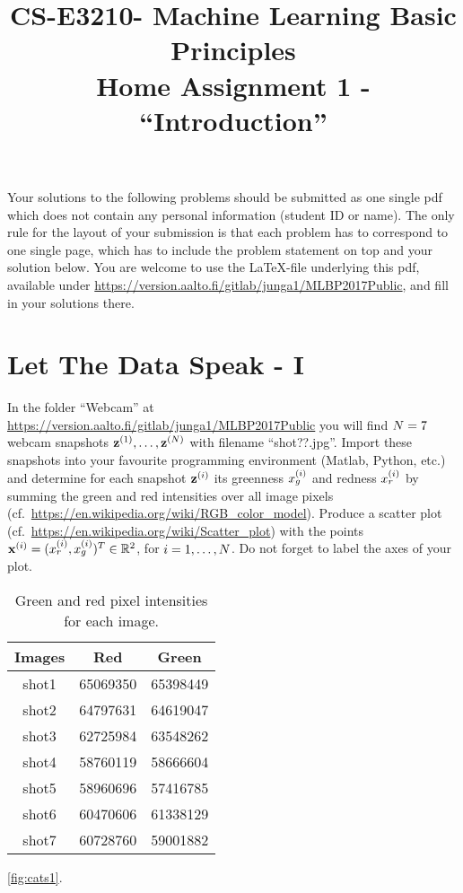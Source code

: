 \documentclass[article,11pt]{article}
\title{CS-E3210- Machine Learning Basic Principles \\ Home Assignment 1 - ``Introduction''}
\begin{document}
\date{}
\maketitle

Your solutions to the following problems should be submitted as one single pdf which does not contain 
any personal information (student ID or name). The only rule for the layout of your submission is that 
each problem has to correspond to one single page, which has to include the problem statement on top 
and your solution below. You are welcome to use the \LaTeX-file underlying this pdf, 
available under \url{https://version.aalto.fi/gitlab/junga1/MLBP2017Public}, and fill in your solutions there. 



\newpage
\section{Let The Data Speak - I}
In the folder ``Webcam'' at \url{https://version.aalto.fi/gitlab/junga1/MLBP2017Public} you will find $N=7$  
webcam snapshots ${\bf z}^{(1)},\ldots,{\bf z}^{(N)}$ with filename ``shot??.jpg''. Import these snapshots into your favourite 
programming environment (Matlab, Python, etc.) and determine for each snapshot ${\bf z}^{(i)}$ its greenness $x_{g}^{(i)}$ 
and redness $x_{r}^{(i)}$ by summing the green and red intensities over all image pixels (cf.\ \url{https://en.wikipedia.org/wiki/RGB_color_model}). 
Produce a scatter plot (cf.\ \url{https://en.wikipedia.org/wiki/Scatter_plot}) with the points ${\bf x}^{(i)}=(x^{(i)}_{r},x^{(i)}_{g})^{T} \in \mathbb{R}^{2}$, for $i=1,\ldots,N$. 
Do not forget to label the axes of your plot. 


\begin{table}[h]
\centering
\begin{tabular}{|c|c|c|}
\hline
\textbf{Images} & \textbf{Red} & \textbf{Green} \\ \hline\hline
shot1           & 65069350       & 65398449        \\ \hline
shot2           & 64797631       & 64619047         \\ \hline
shot3           & 62725984       & 63548262         \\ \hline
shot4           & 58760119       & 58666604         \\ \hline
shot5           & 58960696       & 57416785         \\ \hline
shot6           & 60470606       & 61338129         \\ \hline
shot7           & 60728760      & 59001882         \\ \hline
\end{tabular}
\caption{Green and red pixel intensities for each image.}
\label{tab:t1}
\end{table}
 \ref{fig:cats1}.
\end{document}
